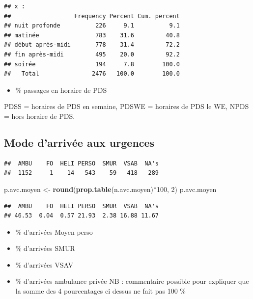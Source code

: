\documentclass[]{article}
\newenvironment{Shaded}{\begin{snugshade}}{\end{snugshade}}
\newcommand{\KeywordTok}[1]{\textcolor[rgb]{0.13,0.29,0.53}{\textbf{{#1}}}}
\newcommand{\DecValTok}[1]{\textcolor[rgb]{0.00,0.00,0.81}{{#1}}}
\newcommand{\StringTok}[1]{\textcolor[rgb]{0.31,0.60,0.02}{{#1}}}
\newcommand{\NormalTok}[1]{{#1}}
\begin{document}
\begin{verbatim}
## x : 
##                  Frequency Percent Cum. percent
## nuit profonde          226     9.1          9.1
## matinée                783    31.6         40.8
## début après-midi       778    31.4         72.2
## fin après-midi         495    20.0         92.2
## soirée                 194     7.8        100.0
##   Total               2476   100.0        100.0
\end{verbatim}

\begin{itemize}
\itemsep1pt\parskip0pt
\item
  \% passages en horaire de PDS
\end{itemize}

PDSS = horaires de PDS en semaine, PDSWE = horaires de PDS le WE, NPDS =
hors horaire de PDS.

\subsection{Mode d'arrivée aux
urgences}\label{mode-darrivee-aux-urgences}

\begin{Shaded}
\end{Shaded}

\begin{verbatim}
##  AMBU    FO  HELI PERSO  SMUR  VSAB  NA's 
##  1152     1    14   543    59   418   289
\end{verbatim}

\begin{Shaded}
\begin{Highlighting}[]
\NormalTok{p.avc.moyen <-}\StringTok{ }\KeywordTok{round}\NormalTok{(}\KeywordTok{prop.table}\NormalTok{(n.avc.moyen)*}\DecValTok{100}\NormalTok{, }\DecValTok{2}\NormalTok{)}
\NormalTok{p.avc.moyen}
\end{Highlighting}
\end{Shaded}

\begin{verbatim}
##  AMBU    FO  HELI PERSO  SMUR  VSAB  NA's 
## 46.53  0.04  0.57 21.93  2.38 16.88 11.67
\end{verbatim}

\begin{itemize}
\itemsep1pt\parskip0pt
\item
  \% d'arrivées Moyen perso
\item
  \% d'arrivées SMUR
\item
  \% d'arrivées VSAV
\item
  \% d'arrivées ambulance privée NB : commentaire possible pour
  expliquer que la somme des 4 pourcentages ci dessus ne fait pas 100 \%
\end{itemize}
\end{document}
